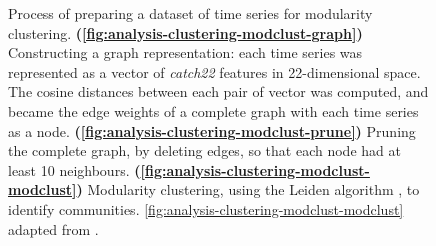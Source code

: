 \begin{figure}
  \caption[
    Process of preparing a dataset of time series for modularity clustering.
  ]{
    Process of preparing a dataset of time series for modularity clustering.
    \textbf{(\ref{fig:analysis-clustering-modclust-graph})}
    Constructing a graph representation: each time series was represented as a vector of \textit{catch22} features in 22-dimensional space.
    The cosine distances between each pair of vector was computed, and became the edge weights of a complete graph with each time series as a node.
    \textbf{(\ref{fig:analysis-clustering-modclust-prune})}
    Pruning the complete graph, by deleting edges, so that each node had at least 10 neighbours.
    \textbf{(\ref{fig:analysis-clustering-modclust-modclust})}
    Modularity clustering, using the Leiden algorithm \parencite{traagLouvainLeidenGuaranteeing2019}, to identify communities.
    \ref{fig:analysis-clustering-modclust-modclust} adapted from \textcite{newmanModularityCommunityStructure2006}.
  }
  \label{fig:analysis-clustering-modclust}
\end{figure}



